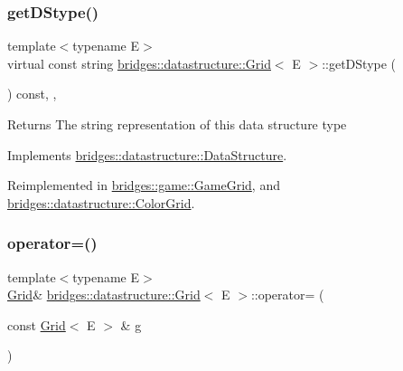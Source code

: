 \subsubsection{\texorpdfstring{get\+D\+Stype()}{getDStype()}}
{\footnotesize\ttfamily template$<$typename E$>$ \\
virtual const string \mbox{\hyperlink{classbridges_1_1datastructure_1_1_grid}{bridges\+::datastructure\+::\+Grid}}$<$ E $>$\+::get\+D\+Stype (\begin{DoxyParamCaption}{ }\end{DoxyParamCaption}) const\hspace{0.3cm}{\ttfamily [inline]}, {\ttfamily [override]}, {\ttfamily [virtual]}}

\begin{DoxyReturn}{Returns}
The string representation of this data structure type 
\end{DoxyReturn}


Implements \mbox{\hyperlink{classbridges_1_1datastructure_1_1_data_structure_a4ff66cb34409f11fe9fc647f6d8a22ce}{bridges\+::datastructure\+::\+Data\+Structure}}.



Reimplemented in \mbox{\hyperlink{classbridges_1_1game_1_1_game_grid_a07da19700a077e3d0f2cde2cade2ba60}{bridges\+::game\+::\+Game\+Grid}}, and \mbox{\hyperlink{classbridges_1_1datastructure_1_1_color_grid_afad945d648b427ca183a1dface8249b7}{bridges\+::datastructure\+::\+Color\+Grid}}.

\mbox{\label{classbridges_1_1datastructure_1_1_grid_a3522d8c94ad390ebafb12257a6c9b82f}} 
\subsubsection{\texorpdfstring{operator=()}{operator=()}}
{\footnotesize\ttfamily template$<$typename E$>$ \\
\mbox{\hyperlink{classbridges_1_1datastructure_1_1_grid}{Grid}}\& \mbox{\hyperlink{classbridges_1_1datastructure_1_1_grid}{bridges\+::datastructure\+::\+Grid}}$<$ E $>$\+::operator= (\begin{DoxyParamCaption}\item[{const \mbox{\hyperlink{classbridges_1_1datastructure_1_1_grid}{Grid}}$<$ E $>$ \&}]{g }\end{DoxyParamCaption})\hspace{0.3cm}{\ttfamily [inline]}}

